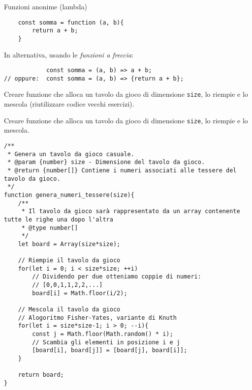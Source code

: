\begin{frame}[fragile]{Funzioni anonime (lambda)}\transfade\centering
  \begin{verbatim}
    const somma = function (a, b){
        return a + b;
    }
  \end{verbatim}
  \pause\bigskip
  In alternativa, usando le \emph{funzioni a freccia}:
  \begin{verbatim}
            const somma = (a, b) => a + b;
// oppure:  const somma = (a, b) => {return a + b};
\end{verbatim}
\end{frame}

\begin{frame}\transfade
  \begin{exercise}\centering
    Creare funzione  che alloca un tavolo da gioco di dimensione \texttt{size}, lo riempie e lo mescola (riutilizzare codice vecchi esercizi).
  \end{exercise}
\end{frame}

\begin{frame}[fragile]\transfade
  \begin{sol}\centering
    Creare funzione  che alloca un tavolo da gioco di dimensione \texttt{size}, lo riempie e lo mescola.
      \begin{verbatim}
/**
 * Genera un tavolo da gioco casuale.
 * @param {number} size - Dimensione del tavolo da gioco.
 * @return {number[]} Contiene i numeri associati alle tessere del tavolo da gioco.
 */
function genera_numeri_tessere(size){
    /**
     * Il tavolo da gioco sarà rappresentato da un array contenente tutte le righe una dopo l'altra
     * @type number[]
     */
    let board = Array(size*size);

    // Riempie il tavolo da gioco
    for(let i = 0; i < size*size; ++i)
        // Dividendo per due otteniamo coppie di numeri:
        // [0,0,1,1,2,2,...]
        board[i] = Math.floor(i/2);

    // Mescola il tavolo da gioco
    // Alogoritmo Fisher-Yates, variante di Knuth
    for(let i = size*size-1; i > 0; --i){
        const j = Math.floor(Math.random() * i);
        // Scambia gli elementi in posizione i e j
        [board[i], board[j]] = [board[j], board[i]];
    }

    return board;
}
      \end{verbatim}
  \end{sol}
\end{frame}
